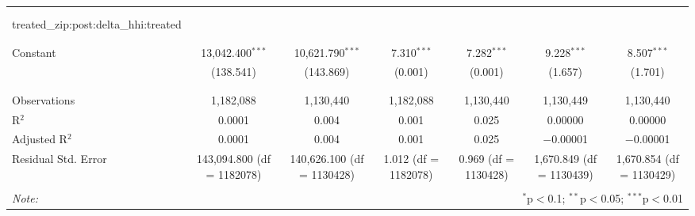 \begin{table}[H]
{\begin{tabular}{@{\extracolsep{5pt}}lcccccc}
   &  &  &  &  &  &  \\  

   & & & & & & \\  

  treated\_zip:post:delta\_hhi:treated &  &  &  &  &  &  \\  

   &  &  &  &  &  &  \\  

   & & & & & & \\  

  Constant & 13,042.400$^{***}$ & 10,621.790$^{***}$ & 7.310$^{***}$ & 7.282$^{***}$ & 9.228$^{***}$ & 8.507$^{***}$ \\  

   & (138.541) & (143.869) & (0.001) & (0.001) & (1.657) & (1.701) \\  

   & & & & & & \\  

 \hline \\[-1.8ex]  

 Observations & 1,182,088 & 1,130,440 & 1,182,088 & 1,130,440 & 1,130,449 & 1,130,440 \\  

 R$^{2}$ & 0.0001 & 0.004 & 0.001 & 0.025 & 0.00000 & 0.00000 \\  

 Adjusted R$^{2}$ & 0.0001 & 0.004 & 0.001 & 0.025 & $-$0.00001 & $-$0.00001 \\  

 Residual Std. Error & 143,094.800 (df = 1182078) & 140,626.100 (df = 1130428) & 1.012 (df = 1182078) & 0.969 (df = 1130428) & 1,670.849 (df = 1130439) & 1,670.854 (df = 1130429) \\  

 \hline  

 \hline \\[-1.8ex]  

 \textit{Note:}  & \multicolumn{6}{r}{$^{*}$p$<$0.1; $^{**}$p$<$0.05; $^{***}$p$<$0.01} \\  

 \end{tabular}}  

 \end{table}  

